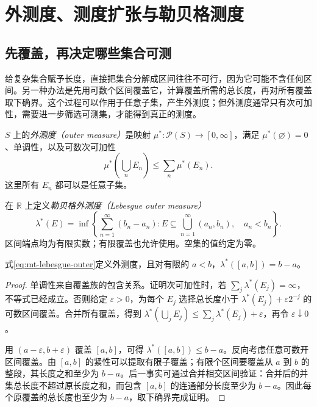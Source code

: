 \setcounter{chapter}{3} %
\chapter{外测度、测度扩张与勒贝格测度}
\label{chap:mt-construction}

\section{先覆盖，再决定哪些集合可测}
给复杂集合赋予长度，直接把集合分解成区间往往不可行，因为它可能不含任何区间。另一种办法是先用可数个区间覆盖它，计算覆盖所需的总长度，再对所有覆盖取下确界。这个过程可以作用于任意子集，产生外测度；但外测度通常只有次可加性，需要进一步筛选可测集，才能得到真正的测度。

\begin{definition}
$S$ 上的\emph{外测度（outer measure）}是映射 $\mu^*:\mathcal P(S)\to[0,\infty]$，满足 $\mu^*(\varnothing)=0$、单调性，以及可数次可加性
\[
 \mu^*\!\left(\bigcup_nE_n\right)\leq\sum_n\mu^*(E_n).
\]
这里所有 $E_n$ 都可以是任意子集。
\end{definition}

在 $\mathbb R$ 上定义\emph{勒贝格外测度（Lebesgue outer measure）}
\begin{equation}
 \lambda^*(E)=\inf\left\{\sum_{n=1}^{\infty}(b_n-a_n):
 E\subseteq\bigcup_{n=1}^{\infty}(a_n,b_n),\quad a_n<b_n\right\}.
 \label{eq:mt-lebesgue-outer}
\end{equation}
区间端点均为有限实数；有限覆盖也允许使用。空集的值约定为零。

\begin{proposition}
式\eqref{eq:mt-lebesgue-outer}定义外测度，且对有限的 $a<b$，$\lambda^*([a,b])=b-a$。
\end{proposition}
\begin{proof}
单调性来自覆盖族的包含关系。证明次可加性时，若 $\sum_j\lambda^*(E_j)=\infty$，不等式已经成立。否则给定 $\varepsilon>0$，为每个 $E_j$ 选择总长度小于 $\lambda^*(E_j)+\varepsilon2^{-j}$ 的可数区间覆盖。合并所有覆盖，得到 $\lambda^*(\bigcup_jE_j)\leq\sum_j\lambda^*(E_j)+\varepsilon$，再令 $\varepsilon\downarrow0$。

用 $(a-\varepsilon,b+\varepsilon)$ 覆盖 $[a,b]$，可得 $\lambda^*([a,b])\leq b-a$。反向考虑任意可数开区间覆盖。由 $[a,b]$ 的紧性可以提取有限子覆盖；有限个区间要覆盖从 $a$ 到 $b$ 的整段，其长度之和至少为 $b-a$。后一事实可通过合并相交区间验证：合并后的并集总长度不超过原长度之和，而包含 $[a,b]$ 的连通部分长度至少为 $b-a$。因此每个原覆盖的总长度也至少为 $b-a$，取下确界完成证明。
\end{proof}

